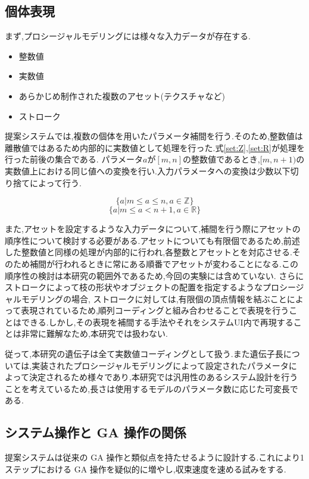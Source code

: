 \subsection{個体表現}
まず,プロシージャルモデリングには様々な入力データが存在する.

\begin{itemize}
      \item 整数値
      \item 実数値
      \item あらかじめ制作された複数のアセット(テクスチャなど)
      \item ストローク
\end{itemize}

提案システムでは,複数の個体を用いたパラメータ補間を行う.そのため,整数値は離散値ではあるため内部的に実数値として処理を行った.式\ref{set:Z},\ref{set:R}が処理を行った前後の集合である.
パラメータ$a$が$[m,n]$の整数値であるとき,$[m,n+1)$の実数値上における同じ値への変換を行い.入力パラメータへの変換は少数以下切り捨てによって行う.

\begin{equation}\label{set:Z}
 \{a | m \leq a \leq n , a\in\mathbb{Z}\}
\end{equation}
\begin{equation}\label{set:R}
 \{a | m \leq a < n + 1 , a\in\mathbb{R}\}
\end{equation}

また,アセットを設定するような入力データについて,補間を行う際にアセットの順序性について検討する必要がある.アセットについても有限個であるため,前述した整数値と同様の処理が内部的に行われ,各整数とアセットとを対応させる.そのため補間が行われるときに常にある順番でアセットが変わることになる.この順序性の検討は本研究の範囲外であるため,今回の実験には含めていない.
さらにストロークによって枝の形状やオブジェクトの配置を指定するようなプロシージャルモデリングの場合,
ストロークに対しては,有限個の頂点情報を結ぶことによって表現されているため,順列コーディングと組み合わせることで表現を行うことはできる.しかし,その表現を補間する手法やそれをシステムUI内で再現することは非常に難解なため,本研究では扱わない.


従って,本研究の遺伝子は全て実数値コーディングとして扱う.また遺伝子長については,実装されたプロシージャルモデリングによって設定されたパラメータによって決定されるため様々であり,本研究では汎用性のあるシステム設計を行うことを考えているため,長さは使用するモデルのパラメータ数に応じた可変長である.

\clearpage
\subsection{システム操作と GA 操作の関係}
提案システムは従来の GA 操作と類似点を持たせるように設計する.これにより1ステップにおける GA 操作を疑似的に増やし,収束速度を速める試みをする.

